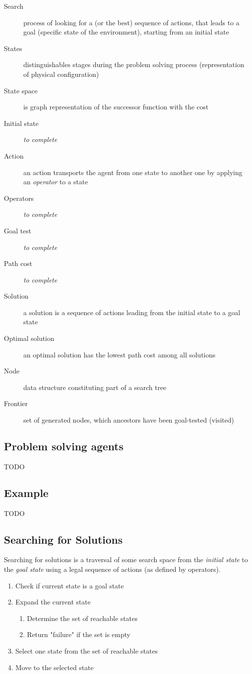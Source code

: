 \begin{description}
\item[Search] process of looking for a (or the best) sequence of actions, that leads to a goal (specific state of the environment), starting from an initial state
\item[States] distinguishables stages during the problem solving process (representation of physical configuration)
\item[State space] is graph representation of the successor function with the cost
\item[Initial state] \textit{to complete}
\item[Action] an action transports the agent from one state to another one by applying an \textit{operator} to a state
\item[Operators] \textit{to complete}
\item[Goal test] \textit{to complete}
\item[Path cost] \textit{to complete}
\item[Solution] a solution is a sequence of actions leading from the initial state to a goal state
\item[Optimal solution] an optimal solution has the lowest path cost among all solutions
\item[Node] data structure constituting part of a search tree
\item[Frontier] set of generated nodes, which ancestors have been goal-tested (visited)
\end{description}

\subsection{Problem solving agents}
TODO

\subsection{Example}
TODO

\subsection{Searching for Solutions}

Searching for solutions is a traversal of some search space from the \textit{initial state} to the \textit{goal state} using a legal sequence of actions (as defined by operators).

\begin{enumerate}
\item Check if current state is a goal state
\item Expand the current state
\begin{enumerate}
\item Determine the set of reachable states
\item Return "failure" if the set is empty
\end{enumerate}
\item Select one state from the set of reachable states
\item Move to the selected state
\end{enumerate}


